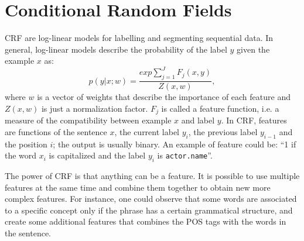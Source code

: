 \section{Conditional Random Fields}
\label{sec:crf}

\ac{CRF} are log-linear models for labelling and segmenting sequential data.
In general, log-linear models describe the probability of the label $y$ given the example $x$ as:
\begin{equation*}
    p(y|x;w) = \frac{exp \sum_{j = 1}^{J} F_{j}(x, y)}{Z(x, w)},
\end{equation*}
where $w$ is a vector of weights that describe the importance of each feature and $Z(x,w)$ is just a normalization factor.
$F_{j}$ is called a feature function, i.e. a measure of the compatibility between example $x$ and label $y$.
In \ac{CRF}, features are functions of the sentence $x$, the current label $y_{i}$, the previous label $y_{i-1}$ and the position $i$;
the output is usually binary.
An example of feature could be: ``1 if the word $x_i$ is capitalized and the label $y_i$ is \texttt{actor.name}''.

The power of \ac{CRF} is that anything can be a feature.
It is possible to use multiple features at the same time and combine them together to obtain new more complex features.
For instance, one could observe that some words are associated to a specific concept only if the phrase has a certain grammatical structure, and create some additional features that combines the \ac{POS} tags with the words in the sentence.
